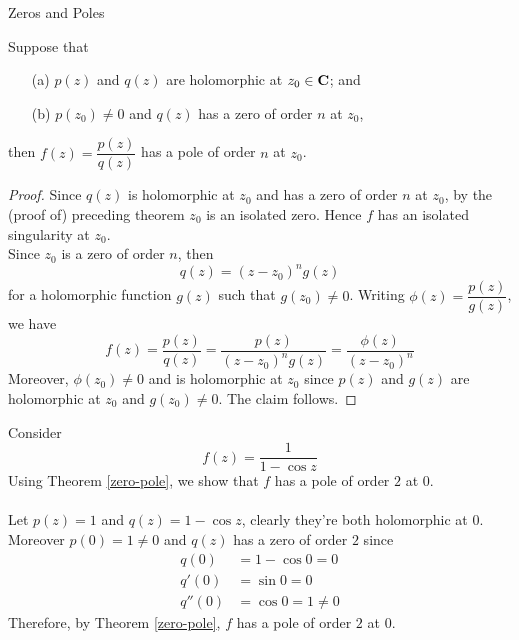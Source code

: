 \begin{mdframed}
\begin{center}
{\Large Zeros and Poles}
\end{center}
\end{mdframed}
\begin{theorem}\label{zero-pole}
Suppose that
\begin{itemize}
\item[(a)] $p(z)$ and $q(z)$ are holomorphic at $z_0 \in \mathbf C$; and
\item[(b)] $p(z_0) \neq 0$ and $q(z)$ has a zero of order $n$ at $z_0$,
\end{itemize}
then $f(z) = \dfrac{p(z)}{q(z)}$ has a pole of order $n$ at $z_0$.
\end{theorem}
\begin{proof}
Since $q(z)$ is holomorphic at $z_0$ and has a zero of order $n$ at $z_0$, by the (proof of) preceding theorem $z_0$ is an isolated zero. Hence $f$ has an isolated singularity at $z_0$.\\[0.5em]
Since $z_0$ is a zero of order $n$, then 
\[q(z) = (z - z_0)^ng(z)\]
for a holomorphic function $g(z)$ such that $g(z_0) \neq 0$. Writing $\phi(z) = \dfrac{p(z)}{g(z)}$, we have
\[f(z) = \frac{p(z)}{q(z)} = \frac{p(z)}{(z - z_0)^ng(z)} = \frac{\phi(z)}{(z - z_0)^n}\]
Moreover, $\phi(z_0) \neq 0$ and is holomorphic at $z_0$ since $p(z)$ and $g(z)$ are holomorphic at $z_0$ and $g(z_0) \neq 0$. The claim follows.
\end{proof}

\vspace*{1em}

\begin{example}
Consider 
\[f(z) = \frac{1}{1 - \cos z}\]
Using Theorem \ref{zero-pole}, we show that $f$ has a pole of order $2$ at $0$.\\
\\
Let $p(z) = 1$ and $q(z) = 1 - \cos z$, clearly they're both holomorphic at $0$. Moreover $p(0) = 1 \neq 0$ and $q(z)$ has a zero of order $2$ since
\begin{align*}
q(0) &= 1 - \cos 0 = 0\\[0.5em]
q'(0) &= \sin 0 = 0\\[0.5em]
q''(0) &= \cos 0 = 1 \neq 0
\end{align*}
Therefore, by Theorem \ref{zero-pole}, $f$ has a pole of order $2$ at $0$.
\end{example}

\vspace*{1em}

